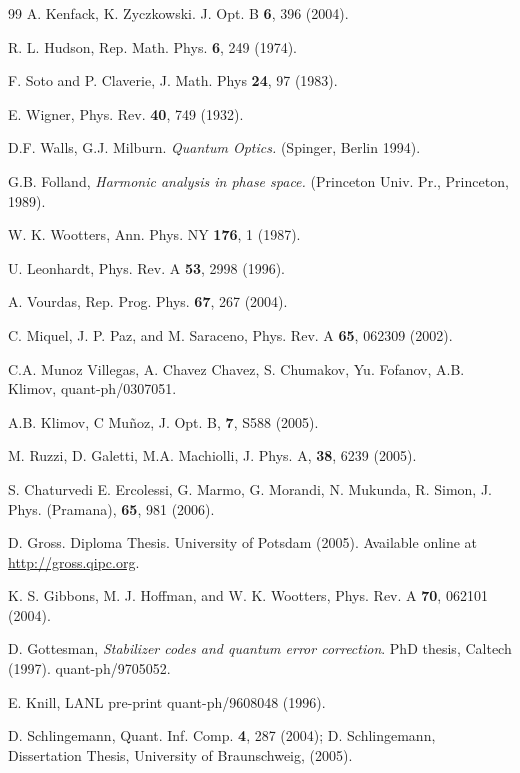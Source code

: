 \documentclass[aps,twocolumn,floatfix]{revtex4}
\begin{document}
\begin{thebibliography}{99}
		A. Kenfack, K. Zyczkowski. J. Opt. B {\bf 6}, 396 (2004).

		R. L. Hudson, Rep. Math. Phys. {\bf 6}, 249 (1974).

		F. Soto and P. Claverie, J. Math. Phys {\bf 24}, 97 (1983).

		E. Wigner, Phys. Rev. {\bf 40}, 749 (1932).

		D.F. Walls, G.J. Milburn. {\it Quantum Optics.} (Spinger, Berlin
		1994).

		G.B. Folland,
		{\it Harmonic analysis in phase space.}
		(Princeton Univ. Pr., Princeton, 1989).

		W. K. Wootters, Ann. Phys. NY {\bf 176}, 1 (1987).

		U. Leonhardt, Phys. Rev. A {\bf 53}, 2998 (1996).

		A. Vourdas, Rep. Prog. Phys. {\bf 67}, 267 (2004).

	 C. Miquel, J. P. Paz, and M. Saraceno, 
	 Phys. Rev. A {\bf 65}, 062309 (2002).

		C.A. Munoz Villegas, A. Chavez Chavez, S. Chumakov, Yu. Fofanov,
		A.B. Klimov, quant-ph/0307051.
	
		A.B. Klimov, C Mu\~noz, J. Opt. B, {\bf 7}, S588 (2005).

		M. Ruzzi, D. Galetti, M.A. Machiolli, J. Phys. A, {\bf 38}, 6239
		(2005).

		S. Chaturvedi  E. Ercolessi, G. Marmo, G. Morandi, N. Mukunda, R.
		Simon, J. Phys. (Pramana), {\bf 65}, 981 (2006).

		D. Gross. Diploma Thesis. University of Potsdam (2005). Available
		online at \url{http://gross.qipc.org}.

		K. S. Gibbons, M. J. Hoffman, and W. K. Wootters, Phys. Rev. A {\bf
		70}, 062101 (2004).

		D. Gottesman, {\it Stabilizer codes and quantum error correction}.
		PhD thesis, Caltech (1997). quant-ph/9705052.

		E. Knill, LANL pre-print quant-ph/9608048 (1996).

		D. Schlingemann, Quant. Inf. Comp. {\bf 4}, 287 (2004);
		D. Schlingemann, Dissertation Thesis, University of Braunschweig,
		(2005).


\end{thebibliography}
\end{document}
